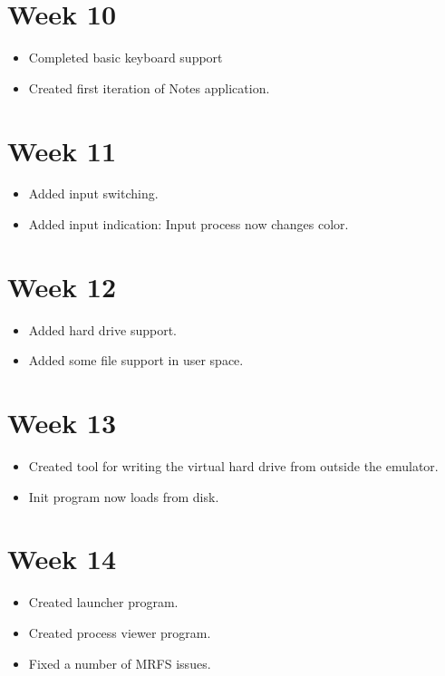 \documentclass[a4paper]{report}
\begin{document}
\section{Week 10}
\begin{itemize}
\item Completed basic keyboard support
\item Created first iteration of Notes application.
\end{itemize}

\section{Week 11}
\begin{itemize}
\item Added input switching.
\item Added input indication: Input process now changes color.
\end{itemize}

\section{Week 12}
\begin{itemize}
\item Added hard drive support.
\item Added some file support in user space.

\end{itemize}

\section{Week 13}
\begin{itemize}
\item Created tool for writing the virtual hard drive from outside the emulator.
\item Init program now loads from disk.
\end{itemize}

\section{Week 14}
\begin{itemize}
\item Created launcher program.
\item Created process viewer program.
\item Fixed a number of MRFS issues.
\end{itemize}
\end{document}
